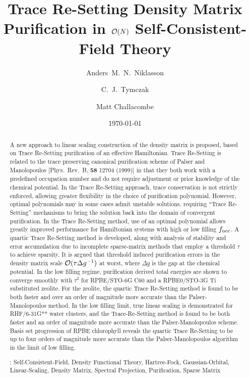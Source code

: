 \commentoutA{\documentclass[prl,aps,twocolumn,showpacs,twocolumngrid,superbib]{revtex4}}
\begin{document}
\date{\today}

\title{Trace Re-Setting Density Matrix Purification in ${\cal O}(N)$ Self-Consistent-Field Theory\footnotemark[4] }

\author{Anders~M.~N.~Niklasson\footnotemark[2]}
\author{C.~J.~Tymczak\footnotemark[3]}
\author{Matt Challacombe\footnotemark[6]}

\begin{abstract}
A new approach to linear scaling construction of the density matrix is proposed,
based on Trace Re-Setting purification of an effective Hamiltonian.  Trace Re-Setting 
is related to the trace preserving canonical purification scheme of Palser and Manolopoulos 
[Phys.~Rev.~B, {\bf 58} 12704 (1999)] in that they both work with a predefined 
occupation number and do not require adjustment or prior knowledge of the chemical 
potential.  In the Trace Re-Setting approach, trace conservation is not strictly enforced, allowing 
greater flexibility in the choice of purification polynomial.  However, optimal polynomials 
may in some cases admit unstable solutions, requiring ``Trace Re-Setting'' mechanisms 
to bring the solution back into the domain of convergent purification.  
In the Trace Re-Setting method, use of an optimal polynomial allows greatly 
improved performance for Hamiltonian systems with high or low filling 
$f_{\rm occ}$.  A quartic Trace Re-Setting method is developed, along with analysis of 
stability and error accumulation due to incomplete sparse-matrix methods that employ a threshold $\tau$ 
to achieve sparsity.  It is argued that threshold induced purification errors in the 
density matrix scale ${\cal O}(\tau \Delta g^{-1})$ at worst, where $\Delta g$ is the gap at 
the chemical potential.  In the low filling regime,  purification derived total energies 
are shown to converge smoothly with $\tau^2$ for RPBE/STO-6G C60 and a RPBE0/STO-3G Ti 
substituted zeolite.  For the zeolite, the quartic Trace Re-Setting method is found to be 
both faster and over an order of magnitude more accurate than the Palser-Manolopoulos method.  In the low 
filling limit, true linear scaling is demonstrated for RHF/6-31G**  water clusters, and the 
Trace-Re-Setting method is found to be both faster and an order of magnitude more accurate 
than the Palser-Manolopoulos scheme.  Basis set progression of RPBE chlorophyll reveals the quartic 
Trace Re-Setting to be up to four orders of magnitude more accurate than the Palser-Manolopoulos algorithm
in the limit of low filling.

\smallskip
{}: Self-Consistent-Field, Density Functional Theory, Hartree-Fock, Gaussian-Orbital, 
                         Linear-Scaling, Density Matrix, Spectral Projection, Purification, Sparse Matrix
\end{abstract}
\end{document}
